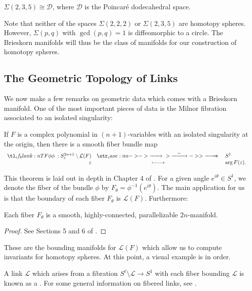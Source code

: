 \begin{proposition}
	$\Sigma(2,3,5)\cong \mathscr{D}$, where $\mathscr{D}$ is the Poincar\'e dodecahedral space.
\end{proposition}

Note that neither of the spaces $\Sigma(2,2,2)$ or $\Sigma(2,3,5)$ are homotopy spheres. However, $\Sigma(p,q)$ with $\gcd(p,q)=1$ is diffeomorphic to a circle. The Brieskorn manifolds will thus be the class of manifolds for our construction of homotopy spheres.

\subsection{The Geometric Topology of Links}

We now make a few remarks on geometric data which comes with a Brieskorn manifold. One of the most important pieces of data is the Milnor fibration associated to an isolated singularity:

\begin{theorem}\label{thm:fibration}
	If $F$ is a complex polynomial in $(n+1)$-variables with an isolated singularity at the origin, then there is a smooth fiber bundle map
	\[
		\lkxfunc{\phi}{S^{2n+1}_\varepsilon \setminus \L(F)}{S^1}{z}{\arg F(z).}
	\]
\end{theorem}

This theorem is laid out in depth in Chapter 4 of \cite{milnor1968hypersurfaces}. For a given angle $e^{i\theta}\in S^1$, we denote the fiber of the bundle $\phi$ by $F_\theta = \phi^{-1}(e^{i\theta})$. The main application for us is that the boundary of each fiber $F_\theta$ is $\mathcal{L}(F)$. Furthermore:

\begin{proposition}
	Each fiber $F_\theta$ is a smooth, highly-connected, parallelizable $2n$-manifold.
\end{proposition}
\begin{proof}
	See Sections 5 and 6 of \cite{milnor1968hypersurfaces}.
\end{proof}

These are the bounding manifolds for $\mathcal{L}(F)$ which allow us to compute invariants for homotopy spheres. At this point, a visual example is in order.
%

\begin{remark*}
	A link $\mathcal{L}$ which arises from a fibration $S^\ell \setminus \mathcal{L} \to S^1$ with each fiber bounding $\mathcal{L}$ is known as a .
	For some general information on fibered links, see \cite{kauffmanneumann1977}.
\end{remark*}



